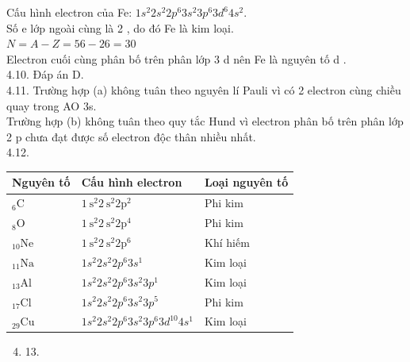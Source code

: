 \documentclass[10pt]{article}
\begin{document}
Cấu hình electron của Fe: $1 s^{2} 2 s^{2} 2 p^{6} 3 s^{2} 3 p^{6} 3 d^{6} 4 s^{2}$.\\
Số e lớp ngoài cùng là 2 , do đó Fe là kim loại.\\
$N=A-Z=56-26=30$\\
Electron cuối cùng phân bố trên phân lớp 3 d nên Fe là nguyên tố d .\\
4.10. Đáp án D.\\
4.11. Trường hợp (a) không tuân theo nguyên lí Pauli vì có 2 electron cùng chiều quay trong AO 3s.\\
Trường hợp (b) không tuân theo quy tắc Hund vì electron phân bố trên phân lớp 2 p chưa đạt được số electron độc thân nhiều nhất.\\
4.12.

\begin{center}
\begin{tabular}{|l|l|l|}
\hline
Nguyên tố & Cấu hình electron & Loại nguyên tố \\
\hline
${ }_{6} \mathrm{C}$ & $1 \mathrm{~s}^{2} 2 \mathrm{~s}^{2} 2 \mathrm{p}^{2}$ & Phi kim \\
\hline
${ }_{8} \mathrm{O}$ & $1 \mathrm{~s}^{2} 2 \mathrm{~s}^{2} 2 \mathrm{p}^{4}$ & Phi kim \\
\hline
${ }_{10} \mathrm{Ne}$ & $1 \mathrm{~s}^{2} 2 \mathrm{~s}^{2} 2 \mathrm{p}^{6}$ & Khí hiếm \\
\hline
${ }_{11} \mathrm{Na}$ & $1 s^{2} 2 s^{2} 2 p^{6} 3 s^{1}$ & Kim loại \\
\hline
${ }_{13} \mathrm{Al}$ & $1 s^{2} 2 s^{2} 2 p^{6} 3 s^{2} 3 p^{1}$ & Kim loại \\
\hline
${ }_{17} \mathrm{Cl}$ & $1 s^{2} 2 s^{2} 2 p^{6} 3 s^{2} 3 p^{5}$ & Phi kim \\
\hline
${ }_{29} \mathrm{Cu}$ & $1 s^{2} 2 s^{2} 2 p^{6} 3 s^{2} 3 p^{6} 3 d^{10} 4 s^{1}$ & Kim loại \\
\hline
\end{tabular}
\end{center}

\begin{enumerate}
  \setcounter{enumi}{3}
  \item 
13.


\end{enumerate}
\end{document}
